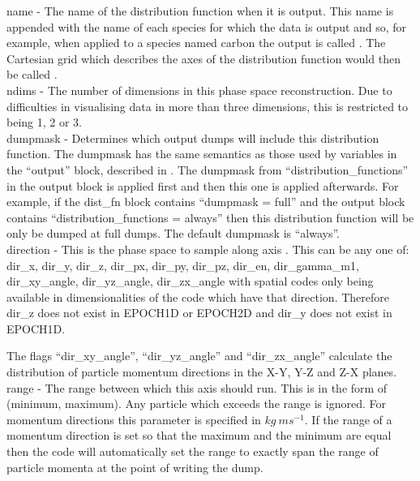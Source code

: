 {\emphtext name} - The name of the distribution function when it is
output. This name is appended with the name of each species for which the data
is output and so, for example, when applied to a species named
carbon the output is called . The Cartesian grid
which describes the axes of the distribution function would then be called
.\\

{\emphtext ndims} - The number of dimensions in this phase space
reconstruction. Due to difficulties in visualising data in more than three
dimensions, this is restricted to being 1, 2 or 3.\\

{\emphtext dumpmask} - Determines which output dumps will include this
distribution function. The dumpmask has the same semantics as those used
by variables in the ``output'' block, described in .
The dumpmask from ``distribution\_functions'' in the output block is applied
first and then this one is applied afterwards. For example, if the
dist\_fn block contains ``dumpmask = full'' and the output block contains
``distribution\_functions = always'' then this distribution function will be
only be dumped at full dumps. The default dumpmask is ``always''.\\

{\emphtext direction} - This is the phase space to sample
along axis . This can be any one of:
dir\_x, dir\_y, dir\_z, dir\_px, dir\_py, dir\_pz, dir\_en, dir\_gamma\_m1,
dir\_xy\_angle, dir\_yz\_angle, dir\_zx\_angle
with spatial codes only being available in dimensionalities of the code which
have that direction. Therefore dir\_z does not exist in EPOCH1D or EPOCH2D
and dir\_y does not exist in EPOCH1D.

The flags ``dir\_xy\_angle'', ``dir\_yz\_angle'' and
``dir\_zx\_angle'' calculate the distribution
of particle momentum directions in the X-Y, Y-Z and Z-X planes.\\

{\emphtext range} - The range between which this axis should
run. This is in the form of (minimum, maximum). Any particle which exceeds
the range is ignored.
For momentum directions this parameter is specified in
$kg\ ms^{-1}$. If the range of a momentum direction is set so that the maximum
and the minimum are equal then the code will automatically set the range to
exactly span the range of particle momenta at the point of writing the dump.\\

